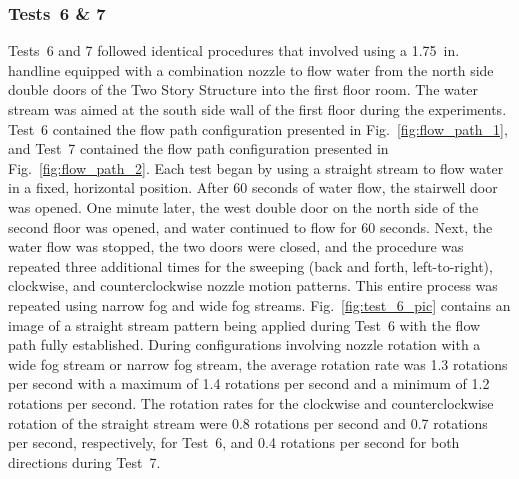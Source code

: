 \documentclass[12pt,oneside]{book}
\begin{document}
\subsubsection{Tests~6 \& 7}
Tests~6 and 7 followed identical procedures that involved using a 1.75~in. handline equipped with a combination nozzle to flow water from the north side double doors of the Two Story Structure into the first floor room. The water stream was aimed at the south side wall of the first floor during the experiments. Test~6 contained the flow path configuration presented in Fig.~\ref{fig:flow_path_1}, and Test~7 contained the flow path configuration presented in Fig.~\ref{fig:flow_path_2}. Each test began by using a straight stream to flow water in a fixed, horizontal position. After 60 seconds of water flow, the stairwell door was opened. One minute later, the west double door on the north side of the second floor was opened, and water continued to flow for 60 seconds. Next, the water flow was stopped, the two doors were closed, and the procedure was repeated three additional times for the sweeping (back and forth, left-to-right), clockwise, and counterclockwise nozzle motion patterns. This entire process was repeated using narrow fog and wide fog streams. Fig.~\ref{fig:test_6_pic} contains an image of a straight stream pattern being applied during Test~6 with the flow path fully established. During configurations involving nozzle rotation with a wide fog stream or narrow fog stream, the average rotation rate was 1.3 rotations per second with a maximum of 1.4 rotations per second and a minimum of 1.2 rotations per second. The rotation rates for the clockwise and counterclockwise rotation of the straight stream were 0.8 rotations per second and 0.7 rotations per second, respectively, for Test~6, and 0.4 rotations per second for both directions during Test~7.
\end{document}
